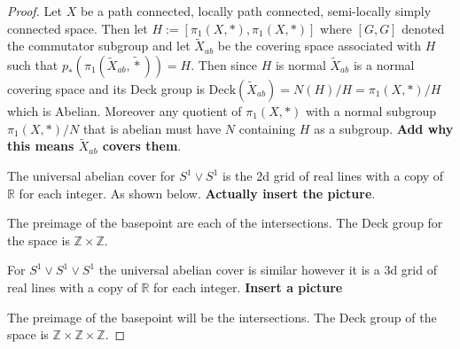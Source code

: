 \documentclass[10pt]{article}
\newcommand{\bb}[1]{\mathbb{#1}}
\theoremstyle{plain}
\theoremstyle{remark}
\begin{document}
\begin{proof}
  Let $X$ be a path connected, locally path connected, semi-locally simply
  connected space. Then let $H:=[\pi_1(X,*),\pi_1(X,*)]$ where
  $[G,G]$ denoted the commutator subgroup and let $\widetilde{X}_{ab}$
  be the covering space associated with $H$ such that
  $p_*(\pi_1(\widetilde{X}_{ab},\widetilde{*}))=H$. Then since $H$ is normal
  $\widetilde{X}_{ab}$ is a normal covering space and its Deck group is
  $\text{Deck}(\widetilde{X}_{ab})=N(H)/H=\pi_1(X,*)/H$
  which is Abelian. Moreover any quotient of $\pi_1(X,*)$ with a normal
  subgroup $\pi_1(X,*)/N$ that is abelian must have $N$ containing $H$ as a
  subgroup. \textbf{Add why this means $\widetilde{X}_{ab}$ covers them}.

  The universal abelian cover for $S^1\vee S^1$ is the 2d grid of real lines
  with a copy of $\bb{R}$ for each integer. As shown below.
  \textbf{Actually insert the picture}.

  The preimage of the basepoint are each of the intersections. The
  Deck group for the space is $\bb{Z}\times\bb{Z}$.

  For $S^1\vee S^1 \vee S^1$ the universal abelian cover is similar however
  it is a 3d grid of real lines with a copy of $\bb{R}$ for each integer.
  \textbf{Insert a picture}

  The preimage of the basepoint will be the intersections. The Deck group
  of the space is $\bb{Z}\times\bb{Z}\times\bb{Z}$.
\end{proof}

\end{document}

